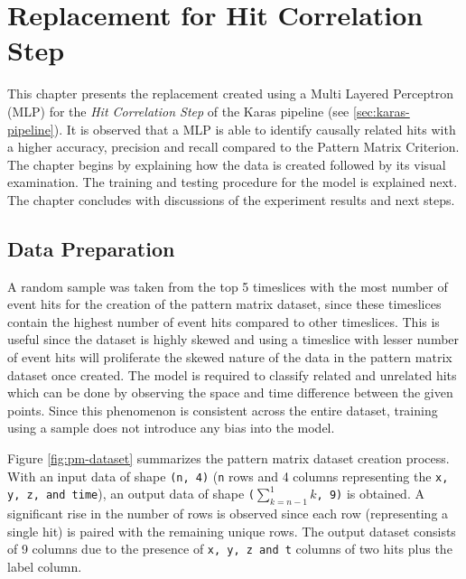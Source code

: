 
\chapter{Replacement for Hit Correlation Step} %

% 
This chapter presents the replacement created using a Multi Layered
Perceptron (MLP) for the \textit{Hit Correlation Step} of the Karas
pipeline (see \ref{sec:karas-pipeline}). It is observed that a MLP is
able to identify causally related hits with a higher accuracy,
precision and recall compared to the Pattern Matrix Criterion. The
chapter begins by explaining how the data is created followed by its
visual examination. The training and testing procedure for the model
is explained next. The chapter concludes with discussions of the
experiment results and next steps.

\section{Data Preparation}
\label{sec:pm-data-prep}

A random sample was taken from the top 5 timeslices with the most
number of event hits for the creation of the pattern matrix dataset,
since these timeslices contain the highest number of event hits
compared to other timeslices. This is useful since the dataset is
highly skewed and using a timeslice with lesser number of event hits
will proliferate the skewed nature of the data in the pattern matrix
dataset once created. The model is required to classify related and
unrelated hits which can be done by observing the space and time
difference between the given points. Since this phenomenon is
consistent across the entire dataset, training using a sample does not
introduce any bias into the model.

Figure \ref{fig:pm-dataset} summarizes the pattern matrix dataset
creation process. With an input data of shape \texttt{(n, 4)}
(\texttt{n} rows and 4 columns representing the \texttt{x, y, z, and
  time}), an output data of shape \texttt{($\sum_{k=n-1}^{1}k$, 9)} is
obtained. A significant rise in the number of rows is observed since
each row (representing a single hit) is paired with the remaining
unique rows. The output dataset consists of 9 columns due to the
presence of \texttt{x, y, z and t} columns of two hits plus the
label column.

